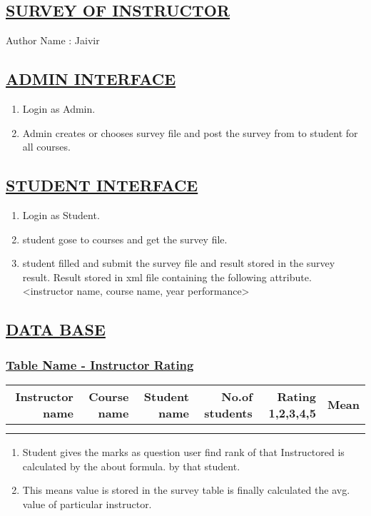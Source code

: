 \documentclass{article}
\begin{document}
\begin{center}
\section*{\underline{SURVEY OF INSTRUCTOR}}
                             Author Name : Jaivir
\end{center}
\subsection*{\underline{ADMIN INTERFACE}}
\begin{enumerate}
\item Login as Admin.
\item Admin creates or chooses survey file and post the survey from to student for all courses.

\begin{center}

\label{figure:Admin_ser.latex}
\end{center}
\end{enumerate}
\subsection*{\underline{STUDENT INTERFACE}}
\begin{enumerate}
\item Login as Student.
\item student gose to courses and get the survey file.
\item student filled and submit the survey file and result stored in the survey result. Result stored in xml file containing the following attribute.
<instructor name, course name, year performance>
\begin{center}

\label{figure:studentinter_ser.latex}
\end{center}
\end{enumerate}
\subsection*{\underline{DATA BASE}}
\subsubsection*{\underline{Table Name - Instructor Rating}}
\begin{tabular}{|r|r|r|r|r|r|}
 \hline
Instructor name & Course name  & Student name & No.of students & Rating 1,2,3,4,5 & Mean  \\  \hline
&&&&& \\ \hline
&&&&& \\ \hline
\end{tabular}
\begin{enumerate}
\item Student gives the marks as question user find rank of that Instructored is calculated by the about formula. by that student.
\item This means value is stored in the survey table is finally calculated the avg. value of particular instructor.
\end{enumerate}
\end{document}
